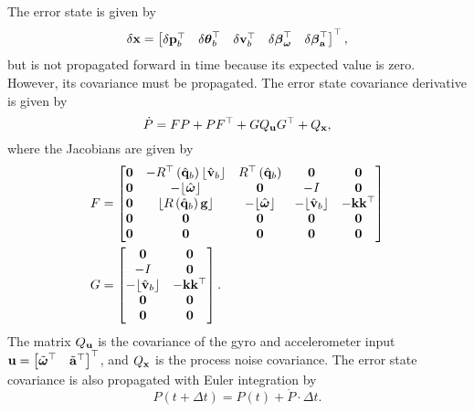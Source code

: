 \documentclass[english]{article}
\begin{document}
The error state is given by
\begin{equation}
\delta{\bf x}=\begin{bmatrix}\delta{\bf p}_{b}^{\top} & \delta{\boldsymbol \theta}_{b}^{\top} & \delta{\bf v}_{b}^{\top} & \delta\boldsymbol{\beta}_{\boldsymbol{\omega}}^{\top} & \delta\boldsymbol{\beta}_{{\bf a}}^{\top}\end{bmatrix}^{\top},
\end{equation}
but is not propagated forward in time because its expected value is zero. However, its covariance must be propagated. The error state covariance derivative is given by
\begin{equation}
\dot{P} = FP + PF^\top + GQ_{\bf u} G^\top + Q_{\bf x},
\end{equation}
where the Jacobians are given by
\begin{align}
F & = 
\begin{bmatrix}
{\bf 0} & -R^\top \left(\hat{{\bf q}}_b \right) \lfloor \hat{{\bf v}}_b \rfloor & R^\top \left(\hat{{\bf q}}_b\right) & {\bf 0} & {\bf 0} \\
{\bf 0} & -\lfloor \hat{\boldsymbol{\omega}} \rfloor & {\bf 0} & -I & {\bf 0} \\
{\bf 0} & \lfloor R\left(\hat{{\bf q}}_b\right) {\bf g} \rfloor & -\lfloor \hat{\boldsymbol{\omega}} \rfloor & -\lfloor \hat{{\bf v}}_b \rfloor & -{\bf k}{\bf k}^\top \\
{\bf 0} & {\bf 0} & {\bf 0} & {\bf 0} & {\bf 0} \\
{\bf 0} & {\bf 0} & {\bf 0} & {\bf 0} & {\bf 0}
\end{bmatrix} \\
G & = 
\begin{bmatrix}
{\bf 0} & {\bf 0} \\
-I & {\bf 0} \\
-\lfloor \hat{{\bf v}}_b \rfloor & -{\bf k}{\bf k}^\top \\
{\bf 0} & {\bf 0} \\
{\bf 0} & {\bf 0}
\end{bmatrix}.
\end{align}
The matrix $Q_{\bf u}$ is the covariance of the gyro and accelerometer input ${\bf u} = \begin{bmatrix} \tilde{\boldsymbol{\omega}}^\top & \tilde{{\bf a}}^\top \end{bmatrix}^\top$, and $Q_{\bf x}$ is the process noise covariance. The error state covariance is also propagated with Euler integration by
\begin{equation}
P\left( t+\Delta t \right) = P\left(t\right) + \dot{P}\cdot \Delta t.
\end{equation}
\end{document}
